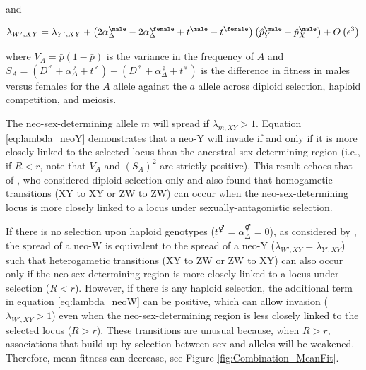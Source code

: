 \documentclass[12pt]{article}
\begin{document}
\noindent 
and 

\begin{equation}
\lambda_{W',XY} =\lambda_{Y',XY}+\left(2\alpha_{\Delta}^\male-2\alpha_{\Delta}^\female+t^\male-t^\female \right) \left( \hat{p}^\male_Y-\hat{p}^\male_X \right)
+O\left(\epsilon^3 \right) \\
\label{eq:lambda_neoW}
\end{equation}

\noindent
where $V_{A}=\bar{p}(1-\bar{p})$ is the variance in the frequency of $A$ and $S_{A}=(D^\male +\alpha_{\Delta}^\male+t^\male) - (D^\female+\alpha_{\Delta}^\female+t^\female)$ is the difference in fitness in males versus females for the $A$ allele against the $a$ allele across diploid selection, haploid competition, and meiosis. 

The neo-sex-determining allele $m$ will spread if $\lambda_{m,XY}>1$. 
Equation \eqref{eq:lambda_neoY} demonstrates that a neo-Y will invade if and only if it is more closely linked to the selected locus than the ancestral sex-determining region (i.e., if $R<r$, note that $V_{A}$ and $(S_{A})^2$ are strictly positive). 
This result echoes that of \citet{vanDoorn:2007eu}, who considered diploid selection only and also found that homogametic transitions (XY to XY or ZW to ZW) can occur when the neo-sex-determining locus is more closely linked to a locus under sexually-antagonistic selection. 

If there is no selection upon haploid genotypes ($t^\Hermaphrodite=\alpha^\Hermaphrodite_{\Delta}=0$), as considered by \citet{vanDoorn:2010hu}, the spread of a neo-W is equivalent to the spread of a neo-Y ($\lambda_{W',XY}=\lambda_{Y',XY}$) such that heterogametic transitions (XY to ZW or ZW to XY) can also occur only if the neo-sex-determining region is more closely linked to a locus under selection ($R<r$). 
However, if there is any haploid selection, the additional term in equation \eqref{eq:lambda_neoW} can be positive, which can allow invasion ($\lambda_{W',XY}>1$) even when the neo-sex-determining region is less closely linked to the selected locus ($R>r$). 
These transitions are unusual because, when $R>r$, associations that build up by selection between sex and alleles will be weakened. 
Therefore, mean fitness can decrease, see Figure \ref{fig:Combination_MeanFit}. 
\end{document}
